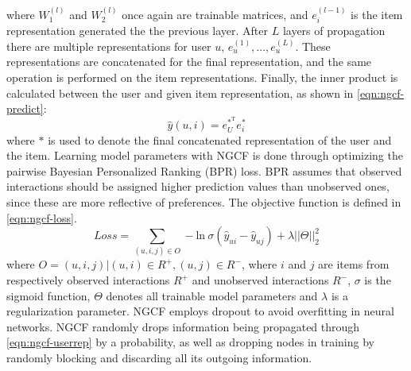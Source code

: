 where $W_1^{(l)}$ and $W_2^{(l)}$ once again are trainable matrices, and $e_i^{(l-1)}$ is the item representation generated the the previous layer.
After $L$ layers of propagation there are multiple representations for user $u$, ${e_u^{(1)},...,e_u^{(L)}}$. These representations are concatenated for the final representation, and the same operation is performed on the item representations.
Finally, the inner product is calculated between the user and given item representation, as shown in \autoref{eqn:ngcf-predict}:
\begin{equation}\label{eqn:ngcf-predict}
  \hat{y}(u, i) = e_U^{*^\textrm{T}} e_i^*
\end{equation}
where $*$ is used to denote the final concatenated representation of the user and the item.
Learning model parameters with NGCF is done through optimizing the pairwise Bayesian Personalized Ranking (BPR) loss.
BPR assumes that observed interactions should be assigned higher prediction values than unobserved ones, since these are more reflective of preferences.
The objective function is defined in \autoref{eqn:ngcf-loss}.
\begin{equation}\label{eqn:ngcf-loss}
    Loss = \sum_{(u, i, j) \in O} - \textrm{ln} \: \sigma (\hat{y}_{ui} - \hat{y}_{uj}) + \lambda ||\Theta||_2^2
\end{equation}
where $O = {(u, i, j) | (u, i) \in R^+, (u, j) \in R^-}$, where $i$ and $j$ are items from respectively observed interactions $R^+$ and unobserved interactions $R^-$, $\sigma$ is the sigmoid function, $\Theta$ denotes all trainable model parameters and $\lambda$ is a regularization parameter.
NGCF employs dropout to avoid overfitting in neural networks.
NGCF randomly drops information being propagated through \autoref{eqn:ngcf-userrep} by a probability, as well as dropping nodes in training by randomly blocking and discarding all its outgoing information.
